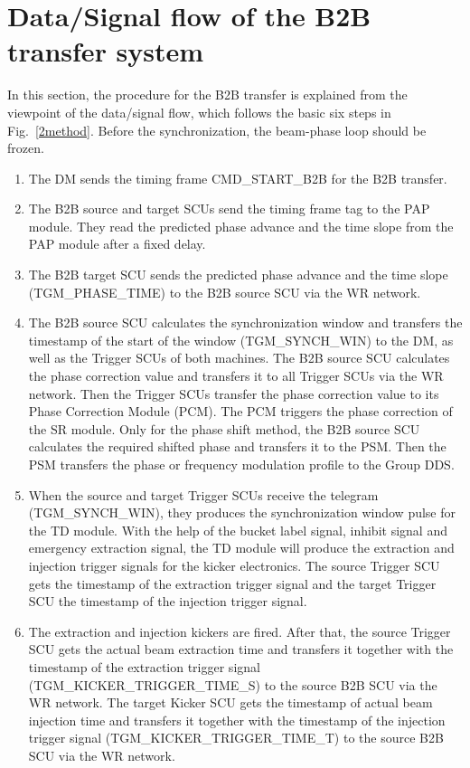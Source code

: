 \section{Data/Signal flow of the B2B transfer system}
In this section, the procedure for the B2B transfer is explained from the viewpoint of the data/signal flow, which follows the basic six steps in Fig.~\ref{2method}. Before the synchronization, the beam-phase loop should be frozen. 

\begin{enumerate}
\item The DM sends the timing frame CMD\_START\_B2B for the B2B transfer. 

\item  The B2B source and target SCUs send the timing frame tag to the PAP module. They read the predicted phase advance and the time slope from the PAP module after a fixed delay. 

\item  The B2B target SCU sends the predicted phase advance and the time slope (TGM\_PHASE\_TIME) to the B2B source SCU via the WR network. 

\item  The B2B source SCU calculates the synchronization window and transfers the timestamp of the start of the window (TGM\_SYNCH\_WIN) to the DM, as well as the Trigger SCUs of both machines.
The B2B source SCU calculates the phase correction value and transfers it to all Trigger SCUs via the WR network. Then the Trigger SCUs transfer the phase correction value to its Phase Correction Module (\gls{PCM}). The PCM triggers the phase correction of the SR module. 
Only for the phase shift method, the B2B source SCU calculates the required shifted phase and transfers it to the PSM. Then the PSM transfers the phase or frequency modulation profile to the Group DDS.  

\item  When the source and target Trigger SCUs receive the telegram (TGM\_SYNCH\_WIN), they produces the synchronization window pulse for the TD module. With the help of the bucket label signal, inhibit signal and emergency extraction signal, the TD module will produce the extraction and injection trigger signals for the kicker electronics.  
The source Trigger SCU gets the timestamp of the extraction trigger signal and the target Trigger SCU the timestamp of the injection trigger signal.
\item  The extraction and injection kickers are fired. 
After that, the source Trigger SCU gets the actual beam extraction time and transfers it together with the timestamp of the extraction trigger signal (TGM\_KICKER\_TRIGGER\_TIME\_S) to the source B2B SCU via the WR network.
The target Kicker SCU gets the timestamp of actual beam injection time and transfers it together with the timestamp of the injection trigger signal (TGM\_KICKER\_TRIGGER\_TIME\_T) to the source B2B SCU via the WR network.


\end{enumerate}
